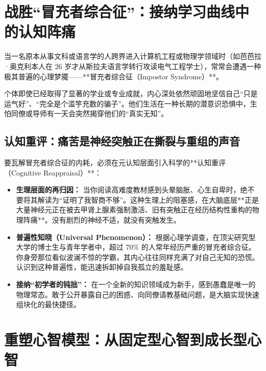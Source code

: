\documentclass[12pt,a4paper,openany]{ctexbook}
\begin{document}
\section{战胜“冒充者综合征”：接纳学习曲线中的认知阵痛}

当一名原本从事文科或语言学的人跨界进入计算机工程或物理学领域时（如芭芭拉·奥克利本人在 26 岁才从斯拉夫语言学转行攻读电气工程学士），常常会遭遇一种极其普遍的心理梦魇——**冒充者综合征（Impostor Syndrome）**。

\begin{keypoint}[冒充者综合征的心理表征]
个体即使已经取得了显著的学业或专业成就，内心深处依然顽固地坚信自己“只是运气好”、“完全是个滥竽充数的骗子”。他们生活在一种长期的潜意识恐惧中，生怕同僚或导师有一天会突然揭穿他们的“真实无知”。
\end{keypoint}

\subsection*{认知重评：痛苦是神经突触正在撕裂与重组的声音}

要瓦解冒充者综合征的内耗，必须在元认知层面引入科学的**认知重评（Cognitive Reappraisal）**：

\begin{practicebox}[应对冒充者情绪的心智框架重置]
\begin{itemize}
    \item \textbf{生理层面的再归因：} 
    当你阅读高难度教材感到头晕脑胀、心生自卑时，绝不要将其解读为“证明了我智商不够”。这种生理上的阻塞感，在大脑底层**正是大量神经元正在被去甲肾上腺素强制激活、旧有突触正在经历结构性重构的物理阵痛**。没有剧烈的神经不适，就没有突触发生。
    
    \item \textbf{普遍性知晓（Universal Phenomenon）：} 
    根据心理学调查，在顶尖研究型大学的博士生与青年学者中，超过 70\% 的人常年经历严重的冒充者综合征。你身旁那位看似波澜不惊的学霸，其内心往往同样充满了对自己无知的恐慌。认识到这种普遍性，能迅速拆卸掉自我孤立的羞耻感。
    
    \item \textbf{接纳“初学者的钝拙”：} 
    在一个全新的知识领域成为新手，感到愚蠢是唯一的物理常态。敢于公开暴露自己的困惑、向同僚请教基础问题，是大脑实现快速组块化的最快捷径。
\end{itemize}
\end{practicebox}

\section{重塑心智模型：从固定型心智到成长型心智}
\end{document}
